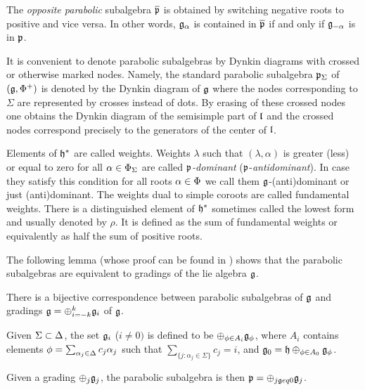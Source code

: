 The \emph{opposite parabolic} subalgebra $\overline{\mathfrak{p}}$  is obtained by switching negative roots to positive and vice versa. In other words, $\mathfrak{g}_\alpha$ is contained in $\overline{\mathfrak{p}}$ if and only if $\mathfrak{g}_{-\alpha}$ is in $\mathfrak{p}$.

It is convenient to denote parabolic subalgebras by Dynkin diagrams with crossed or otherwise marked nodes. Namely, the standard parabolic subalgebra $\mathfrak{p}_\Sigma$ of $(\mathfrak{g},\Phi^+)$ is denoted by the Dynkin diagram of $\mathfrak{g}$ where the nodes corresponding to $\Sigma$ are represented by crosses instead of dots. By erasing of these crossed nodes one obtains the Dynkin diagram of the semisimple part of $\mathfrak{l}$ and the crossed nodes correspond precisely to the generators of the center of $\mathfrak{l}$.


Elements of $\mathfrak{h}^*$ are called weights. Weights $\lambda$ such that $(\lambda, \alpha)$ is greater (less) or equal to zero for all $\alpha \in \Phi_\Sigma$ are called \emph{$\mathfrak{p}$-dominant} ($\mathfrak{p}$-\emph{antidominant}). In case they satisfy this condition for all roots $\alpha \in \Phi$ we call them $\mathfrak{g}$-(anti)dominant or just (anti)dominant. The weights dual to simple coroots are called fundamental weights. There is a distinguished element of $\mathfrak{h}^*$ sometimes called the lowest form and usually denoted by $\rho$. It is defined as the sum of fundamental weights or equivalently as half the sum of positive roots. 

The following lemma (whose proof can be found in \cite{cap_parabolic_2009}) shows that the parabolic subalgebras are equivalent to gradings of the lie algebra $\mathfrak{g}$.
\begin{lemma}
There is a bijective correspondence between parabolic subalgebras of $\mathfrak{g}$ and gradings $\mathfrak{g}=\oplus_{i=-k}^k \mathfrak{g}_i$ of $\mathfrak{g}$.

	Given $\Sigma\subset\Delta$, the set $\mathfrak{g}_i$ ($i\neq 0)$ is defined to be $\oplus_{\phi\in A_i} \mathfrak{g}_\phi$, where $A_i$ contains elements $\phi=\sum_{\alpha_j\in\Delta} c_j \alpha_j$ such that $\sum_{\{j:\alpha_j\in\Sigma\}} c_j=i$, and $\mathfrak{g}_0=\mathfrak{h}\oplus_{\phi\in A_0} \mathfrak{g}_\phi$.

	Given a grading $\oplus_j \mathfrak{g}_j$, the parabolic subalgebra is then $\mathfrak{p}=\oplus_{j\mathfrak{g}eq 0}\mathfrak{g}_j$.
\end{lemma}

